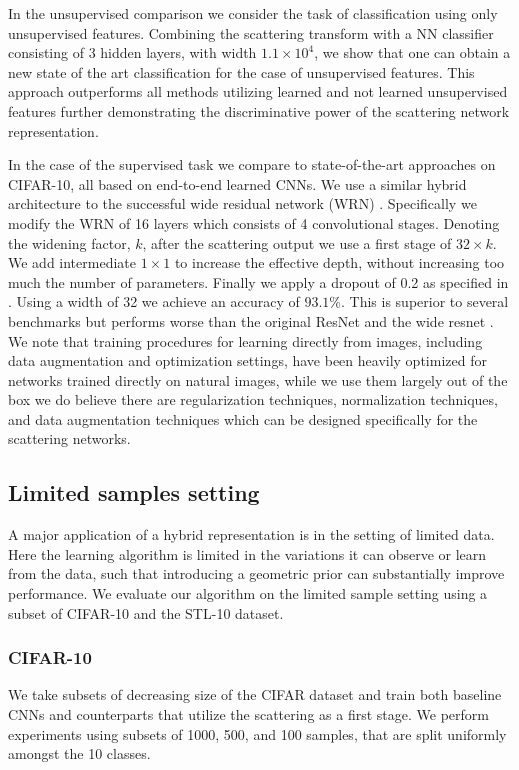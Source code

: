 \documentclass[10pt,twocolumn,letterpaper]{article}
\begin{document}
In the unsupervised comparison we consider the task of classification using only unsupervised features. Combining the scattering transform with a NN classifier consisting of 3 hidden layers, with width $1.1\times10^4$, we show that one can obtain a new state of the art classification for the case of unsupervised features. This approach outperforms all methods utilizing learned and not learned unsupervised features further demonstrating the discriminative power of the scattering network representation. 

In the case of the supervised task we compare to state-of-the-art approaches on CIFAR-10, all based on end-to-end learned CNNs. We use a similar hybrid architecture to the successful wide residual network (WRN) \cite{zagoruyko2016wide}. Specifically we modify the WRN of 16 layers which consists of 4 convolutional stages. Denoting the widening factor, $k$, after the scattering output we use a first stage of $32\times k$. We add intermediate $1\times 1$ to increase the effective depth, without increasing too much the number of parameters. Finally we apply a dropout of 0.2 as specified in \cite{zagoruyko2016wide}.
Using a width of 32 we achieve an accuracy of $93.1\%$. This is superior to several benchmarks but performs worse than the original ResNet \cite{he2015deep} and the wide resnet \cite{zagoruyko2016wide}. We note that training procedures for learning directly from images, including data augmentation and optimization settings, have been heavily optimized for networks trained directly on natural images, while we use them largely out of the box we do believe there are regularization techniques, normalization techniques, and data augmentation techniques which can be designed specifically for the scattering networks.





\subsection{Limited samples setting}
\label{verysmall}
A major application of a hybrid representation is in the setting of limited data. Here the learning algorithm is limited in the variations it can observe or learn from the data, such that introducing a geometric prior can substantially improve performance. We evaluate our algorithm on the limited sample setting using a subset of CIFAR-10 and the STL-10 dataset.

\subsubsection{CIFAR-10}
We take subsets of decreasing size of the CIFAR dataset and train both baseline CNNs and counterparts that utilize the scattering as a first stage. We perform experiments using subsets of 1000, 500, and 100 samples, that are split uniformly amongst the 10 classes. 
\end{document}
